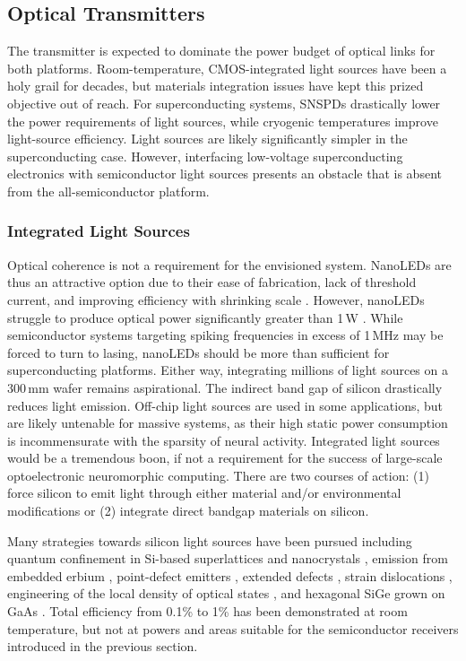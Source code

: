 \documentclass[twocolumn]{article}
\begin{document}
\subsection{Optical Transmitters}
The transmitter is expected to dominate the power budget of optical links for both platforms. Room-temperature, CMOS-integrated light sources have been a holy grail for decades, but materials integration issues have kept this prized objective out of reach. For superconducting systems, SNSPDs drastically lower the power requirements of light sources, while cryogenic temperatures improve light-source efficiency. Light sources are likely significantly simpler in the superconducting case. However, interfacing low-voltage superconducting electronics with semiconductor light sources \cite{mccaughan2019superconducting} presents an obstacle that is absent from the all-semiconductor platform.

\subsubsection{Integrated Light Sources}
Optical coherence is not a requirement for the envisioned system. NanoLEDs are thus an attractive option due to their ease of fabrication, lack of threshold current, and improving efficiency with shrinking scale \cite{romeira2019physical}. However, nanoLEDs struggle to produce optical power significantly greater than 1\,\textmu W \cite{romeira2019physical}. While semiconductor systems targeting spiking frequencies in excess of 1\,MHz may be forced to turn to lasing, nanoLEDs should be more than sufficient for superconducting platforms. Either way, integrating millions of light sources on a 300\,mm wafer remains aspirational. The indirect band gap of silicon drastically reduces light emission. Off-chip light sources are used in some applications, but are likely untenable for massive systems, as their high static power consumption is incommensurate with the sparsity of neural activity. Integrated light sources would be a tremendous boon, if not a requirement for the success of large-scale optoelectronic neuromorphic computing. There are two courses of action: (1) force silicon to emit light through either material and/or environmental modifications or (2) integrate direct bandgap materials on silicon. 

Many strategies towards silicon light sources have been pursued \cite{iyxi1993,shxu2007} including quantum confinement in Si-based superlattices \cite{warga2008electroluminescence} and nanocrystals \cite{wabo2005}, emission from embedded erbium \cite{enpo1985,paga1996}, point-defect emitters \cite{brha1986,brbr1989,rosh2007b,bata2007}, extended defects \cite{ng2001efficient}, strain dislocations \cite{kvba2004}, engineering of the local density of optical states \cite{grzh2001}, and hexagonal SiGe grown on GaAs \cite{Fadaly2020}. Total efficiency from 0.1\% \cite{kvba2004} to 1\% \cite{grzh2001} has been demonstrated at room temperature, but not at powers and areas suitable for the semiconductor receivers introduced in the previous section.
\end{document}
